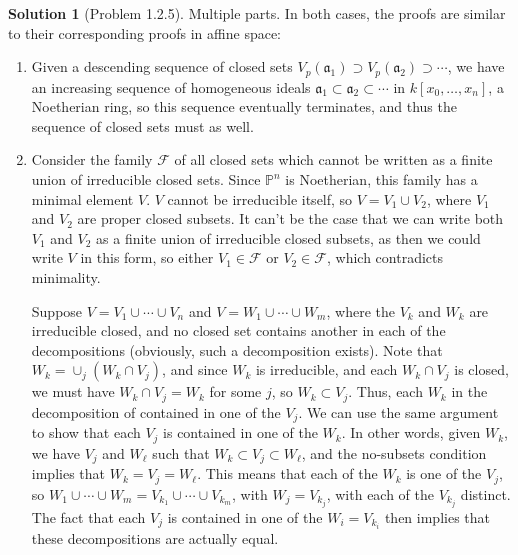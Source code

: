 \documentclass[aps,pra,showpacs,notitlepage,onecolumn,superscriptaddress,nofootinbib]{revtex4-1}
\theoremstyle{definition}
\newtheorem{solution}{Solution}[section]
\begin{document}
\begin{solution}[Problem 1.2.5]
  Multiple parts. In both cases, the proofs are similar to their corresponding proofs in affine space:
  \begin{enumerate}
    \item Given a descending sequence of closed sets $V_p(\mathfrak{a}_1) \supset V_p(\mathfrak{a}_2) \supset \cdots$, we have an increasing sequence of homogeneous ideals $\mathfrak{a}_1 \subset \mathfrak{a}_2 \subset \cdots$
      in $k[x_0, \dots, x_n]$, a Noetherian ring, so this sequence eventually terminates, and thus the sequence of closed sets must as well.
      \item Consider the family $\mathcal{F}$ of all closed sets which cannot be written as a finite union of irreducible closed sets. Since $\mathbb{P}^n$ is Noetherian, this family has a minimal element $V$. $V$ cannot
        be irreducible itself, so $V = V_1 \cup V_2$, where $V_1$ and $V_2$ are proper closed subsets. It can't be the case that we can write both $V_1$ and $V_2$ as a finite union of irreducible closed subsets, as then
        we could write $V$ in this form, so either $V_1 \in \mathcal{F}$ or $V_2 \in \mathcal{F}$, which contradicts minimality.

        Suppose $V = V_1 \cup \cdots \cup V_n$ and $V = W_1 \cup \cdots \cup W_m$, where the $V_k$ and $W_k$ are irreducible closed, and no closed set contains another in each of the decompositions (obviously,
        such a decomposition exists). Note that $W_k = \cup_j (W_k \cap V_j)$, and since $W_k$
        is irreducible, and each $W_k \cap V_j$ is closed, we must have $W_k \cap V_j = W_k$ for some $j$, so $W_k \subset V_j$. Thus, each $W_k$ in the decomposition of contained in one of the
        $V_j$. We can use the same argument to show that each $V_j$ is contained in one of the $W_k$. In other words, given $W_k$, we have $V_j$ and $W_{\ell}$ such that $W_k \subset V_j \subset W_{\ell}$, and
        the no-subsets condition implies that $W_k = V_j = W_{\ell}$. This means that each of the $W_k$ is one of the $V_j$, so $W_1 \cup \cdots \cup W_m = V_{k_1} \cup \cdots \cup V_{k_m}$, with $W_j = V_{k_j}$,
        with each of the $V_{k_j}$ distinct. The fact that each $V_j$ is contained in one of the $W_{i} = V_{k_i}$ then implies that these decompositions are actually equal.
    \end{enumerate}
  \end{solution}
\end{document}
